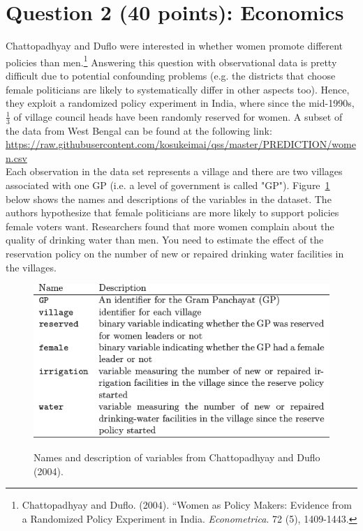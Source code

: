 \documentclass[12pt,letterpaper]{article}
\begin{document}
\section*{Question 2 (40 points): Economics}
Chattopadhyay and Duflo were interested in whether women promote different policies than men.\footnote{Chattopadhyay and Duflo. (2004). ``Women as Policy Makers: Evidence from a Randomized Policy Experiment in India. \textit{Econometrica}. 72 (5), 1409-1443.} Answering this question with observational data is pretty difficult due to potential confounding problems (e.g. the districts that choose female politicians are likely to systematically differ in other aspects too). Hence, they exploit a randomized policy experiment in India, where since the mid-1990s, $\frac{1}{3}$ of village council heads have been randomly reserved for women. A subset of the data from West Bengal can be found at the following link: \url{https://raw.githubusercontent.com/kosukeimai/qss/master/PREDICTION/women.csv}\\

\noindent Each observation in the data set represents a village and there are two villages associated with one GP (i.e. a level of government is called "GP"). Figure~\ref{fig:women_desc} below shows the names and descriptions of the variables in the dataset. The authors hypothesize that female politicians are more likely to support policies female voters want. Researchers found that more women complain about the quality of drinking water than men. You need to estimate the effect of the reservation policy on the number of new or repaired drinking water facilities in the villages.
\vspace{.5cm}
\begin{figure}[h!]
	\caption{\footnotesize{Names and description of variables from Chattopadhyay and Duflo (2004).}}
	\vspace{.5cm}
	\centering
	\label{fig:women_desc}
	\includegraphics[width=1.1\textwidth]{women_desc.png}\\
	
\end{figure}		
\end{document}
